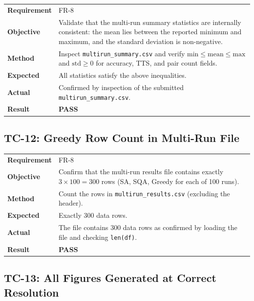 \documentclass[12pt,a4paper]{article}
\newcommand{\pass}{\textcolor{green!50!black}{\textbf{PASS}}}
\begin{document}
\begin{table}[h!]
\renewcommand{\arraystretch}{1.3}
\begin{tabular}{@{}lp{10cm}@{}}
\toprule
\textbf{Requirement} & FR-8 \\
\textbf{Objective} & Validate that the multi-run summary statistics are
    internally consistent: the mean lies between the reported minimum
    and maximum, and the standard deviation is non-negative. \\
\textbf{Method} & Inspect \texttt{multirun\_summary.csv} and verify
    $\text{min} \leq \text{mean} \leq \text{max}$ and $\text{std} \geq 0$
    for accuracy, TTS, and pair count fields. \\
\textbf{Expected} & All statistics satisfy the above inequalities. \\
\textbf{Actual} & Confirmed by inspection of the submitted
    \texttt{multirun\_summary.csv}. \\
\textbf{Result} & \pass \\
\bottomrule
\end{tabular}
\end{table}

\subsection{TC-12: Greedy Row Count in Multi-Run File}

\begin{table}[h!]
\renewcommand{\arraystretch}{1.3}
\begin{tabular}{@{}lp{10cm}@{}}
\toprule
\textbf{Requirement} & FR-8 \\
\textbf{Objective} & Confirm that the multi-run results file contains
    exactly $3 \times 100 = 300$ rows (SA, SQA, Greedy for each of
    100 runs). \\
\textbf{Method} & Count the rows in \texttt{multirun\_results.csv}
    (excluding the header). \\
\textbf{Expected} & Exactly 300 data rows. \\
\textbf{Actual} & The file contains 300 data rows as confirmed
    by loading the file and checking \texttt{len(df)}. \\
\textbf{Result} & \pass \\
\bottomrule
\end{tabular}
\end{table}

\subsection{TC-13: All Figures Generated at Correct Resolution}
\end{document}
